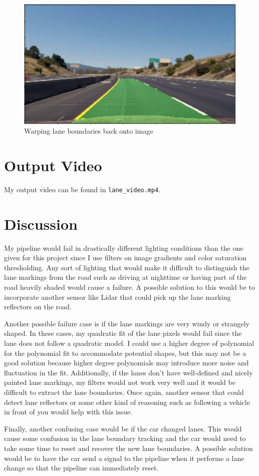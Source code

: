 \documentclass[12pt]{article}
\begin{document}
\begin{figure}[h]
\centering
\includegraphics[scale=0.75]{lane_test.png}
\caption{Warping lane boundaries back onto image}
\label{fig:lane_plot}
\end{figure}

\section{Output Video}
My output video can be found in \texttt{lane\_video.mp4}.

\section{Discussion}
My pipeline would fail in drastically different lighting conditions than the one given for this project since I use filters on image gradients and color saturation thresholding. Any sort of lighting that would make it difficult to distinguish the lane markings from the road such as driving at nighttime or having part of the road heavily shaded would cause a failure. A possible solution to this would be to incorporate another sensor like Lidar that could pick up the lane marking reflectors on the road.

Another possible failure case is if the lane markings are very windy or strangely shaped. In these cases, my quadratic fit of the lane pixels would fail since the lane does not follow a quadratic model. I could use a higher degree of polynomial for the polynomial fit to accommodate potential shapes, but this may not be a good solution because higher degree polynomials may introduce more noise and fluctuation in the fit. Additionally, if the lanes don't have well-defined and nicely painted lane markings, my filters would not work very well and it would be difficult to extract the lane boundaries. Once again, another sensor that could detect lane reflectors or some other kind of reasoning such as following a vehicle in front of you would help with this issue.

Finally, another confusing case would be if the car changed lanes. This would cause some confusion in the lane boundary tracking and the car would need to take some time to reset and recover the new lane boundaries. A possible solution would be to have the car send a signal to the pipeline when it performs a lane change so that the pipeline can immediately reset. 
 
\end{document}
